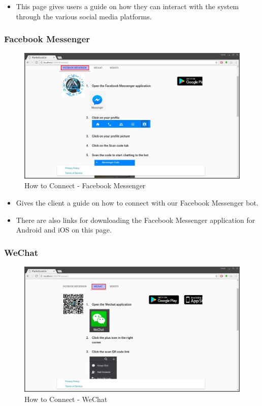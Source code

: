 \documentclass{article}
\begin{document}
			\begin{itemize}
				\item This page gives users a guide on how they can interact with the system through the various social media platforms.
			\end{itemize}

			\subsubsection{Facebook Messenger}
				\begin{figure}[H]
					\includegraphics[width=\textwidth]{images/how_to_connect_facebook_messenger.jpg}
					\caption{How to Connect - Facebook Messenger}
				\end{figure}

				\begin{itemize}
					\item Gives the client a guide on how to connect with our Facebook Messenger bot.
					\item There are also links for downloading the Facebook Messenger application for Android and iOS on this page.
				\end{itemize}

			\subsubsection{WeChat}
				\begin{figure}[H]
					\includegraphics[width=\textwidth]{images/how_to_connect_wechat.jpg}
					\caption{How to Connect - WeChat}
				\end{figure}
\end{document}
